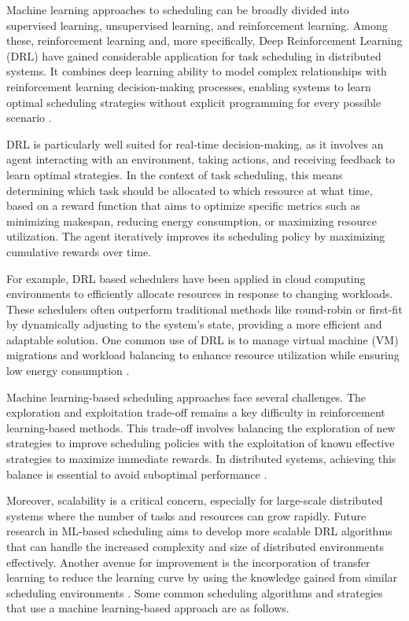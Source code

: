 Machine learning approaches to scheduling can be broadly divided into supervised learning, unsupervised learning, and reinforcement learning. Among these, reinforcement learning and, more specifically, Deep Reinforcement Learning (DRL) have gained considerable application for task scheduling in distributed systems. It combines deep learning ability to model complex relationships with reinforcement learning decision-making processes, enabling systems to learn optimal scheduling strategies without explicit programming for every possible scenario \cite{jalali2024}.

DRL is particularly well suited for real-time decision-making, as it involves an agent interacting with an environment, taking actions, and receiving feedback to learn optimal strategies. In the context of task scheduling, this means determining which task should be allocated to which resource at what time, based on a reward function that aims to optimize specific metrics such as minimizing makespan, reducing energy consumption, or maximizing resource utilization. The agent iteratively improves its scheduling policy by maximizing cumulative rewards over time.

For example, DRL based schedulers have been applied in cloud computing environments to efficiently allocate resources in response to changing workloads. These schedulers often outperform traditional methods like round-robin or first-fit by dynamically adjusting to the system's state, providing a more efficient and adaptable solution. One common use of DRL is to manage virtual machine (VM) migrations and workload balancing to enhance resource utilization while ensuring low energy consumption \cite{srikanth2023}.

Machine learning-based scheduling approaches face several challenges. The exploration and exploitation trade-off remains a key difficulty in reinforcement learning-based methods. This trade-off involves balancing the exploration of new strategies to improve scheduling policies with the exploitation of known effective strategies to maximize immediate rewards. In distributed systems, achieving this balance is essential to avoid suboptimal performance \cite{jalali2024}.

Moreover, scalability is a critical concern, especially for large-scale distributed systems where the number of tasks and resources can grow rapidly. Future research in ML-based scheduling aims to develop more scalable DRL algorithms that can handle the increased complexity and size of distributed environments effectively. Another avenue for improvement is the incorporation of transfer learning to reduce the learning curve by using the knowledge gained from similar scheduling environments \cite{Zhou2024}. Some common scheduling algorithms and strategies that use a machine learning-based approach are as follows.


